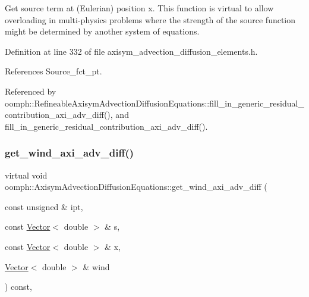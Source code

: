 Get source term at (Eulerian) position x. This function is virtual to allow overloading in multi-\/physics problems where the strength of the source function might be determined by another system of equations. 



Definition at line 332 of file axisym\+\_\+advection\+\_\+diffusion\+\_\+elements.\+h.



References Source\+\_\+fct\+\_\+pt.



Referenced by oomph\+::\+Refineable\+Axisym\+Advection\+Diffusion\+Equations\+::fill\+\_\+in\+\_\+generic\+\_\+residual\+\_\+contribution\+\_\+axi\+\_\+adv\+\_\+diff(), and fill\+\_\+in\+\_\+generic\+\_\+residual\+\_\+contribution\+\_\+axi\+\_\+adv\+\_\+diff().

\mbox{\label{classoomph_1_1AxisymAdvectionDiffusionEquations_a5572befdf0d7410e7443dc44c4440595}} 
\subsubsection{\texorpdfstring{get\+\_\+wind\+\_\+axi\+\_\+adv\+\_\+diff()}{get\_wind\_axi\_adv\_diff()}}
{\footnotesize\ttfamily virtual void oomph\+::\+Axisym\+Advection\+Diffusion\+Equations\+::get\+\_\+wind\+\_\+axi\+\_\+adv\+\_\+diff (\begin{DoxyParamCaption}\item[{const unsigned \&}]{ipt,  }\item[{const \hyperlink{classoomph_1_1Vector}{Vector}$<$ double $>$ \&}]{s,  }\item[{const \hyperlink{classoomph_1_1Vector}{Vector}$<$ double $>$ \&}]{x,  }\item[{\hyperlink{classoomph_1_1Vector}{Vector}$<$ double $>$ \&}]{wind }\end{DoxyParamCaption}) const\hspace{0.3cm}{\ttfamily [inline]}, {\ttfamily [virtual]}}




